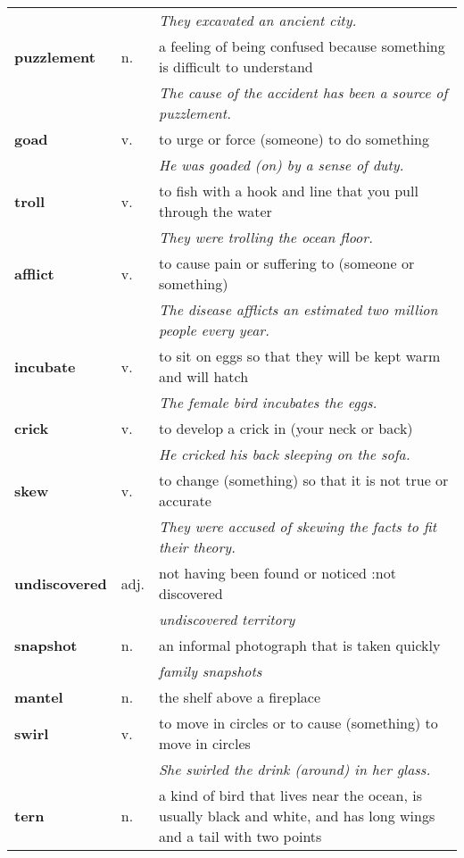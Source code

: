 \documentclass[a4paper]{article}
\begin{document}
\begin{longtable}{llp{11cm}}
 & & \textit{They excavated an ancient city.}\\[0.08cm]
\textbf{puzzlement} & n. &  a feeling of being confused because something is difficult to understand \\
 & & \textit{The cause of the accident has been a source of puzzlement.}\\[0.08cm]
\textbf{goad} & v. &  to urge or force (someone) to do something \\
 & & \textit{He was goaded (on) by a sense of duty.}\\[0.08cm]
\textbf{troll} & v. &  to fish with a hook and line that you pull through the water \\
 & & \textit{They were trolling the ocean floor.}\\[0.08cm]
\textbf{afflict} & v. &  to cause pain or suffering to (someone or something) \\
 & & \textit{The disease afflicts an estimated two million people every year.}\\[0.08cm]
\textbf{incubate} & v. &  to sit on eggs so that they will be kept warm and will hatch \\
 & & \textit{The female bird incubates the eggs.}\\[0.08cm]
\textbf{crick} & v. &  to develop a crick in (your neck or back) \\
 & & \textit{He cricked his back sleeping on the sofa.}\\[0.08cm]
\textbf{skew} & v. &  to change (something) so that it is not true or accurate \\
 & & \textit{They were accused of skewing the facts to fit their theory.}\\[0.08cm]
\textbf{undiscovered} & adj. &  not having been found or noticed :not discovered \\
 & & \textit{undiscovered territory}\\[0.08cm]
\textbf{snapshot} & n. &  an informal photograph that is taken quickly \\
 & & \textit{family snapshots}\\[0.08cm]
\textbf{mantel} & n. &  the shelf above a fireplace \\[0.08cm]
\textbf{swirl} & v. &  to move in circles or to cause (something) to move in circles \\
 & & \textit{She swirled the drink (around) in her glass.}\\[0.08cm]
\textbf{tern} & n. &  a kind of bird that lives near the ocean, is usually black and white, and has long wings and a tail with two points\\[0.08cm]

\end{longtable}
\end{document}
